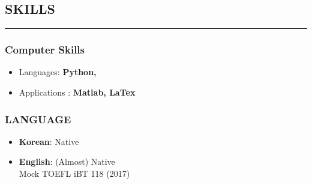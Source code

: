 \documentclass[10pt,a4]{article}
\begin{document}
\begin{small}


\lhead{\textcolor{gray}{\it Junghyun Lee}}
\fancyfoot[C]{}

\subsection*{SKILLS}
\hrule
\vspace{0.2cm}

\subsubsection*{Computer Skills}

\begin{itemize}
	\item Languages: \textbf{Python,
	}
	\item Applications : \textbf{Matlab,
	 LaTex}
\end{itemize}

\subsubsection*{LANGUAGE}

\begin{itemize}{}{}
	\item \textbf{Korean}: Native
	\item \textbf{English}: (Almost) Native \\
	Mock TOEFL iBT 118 (2017)
	
\end{itemize}

\vspace{0.1cm}


\end{small}
\end{document}

